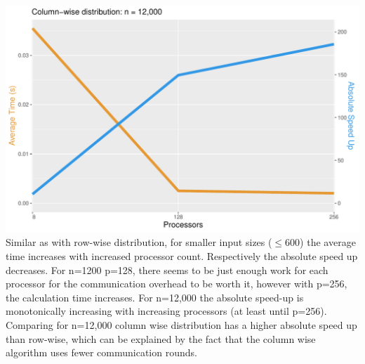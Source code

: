 \documentclass[a4paper,%
11pt,%
DIV=12,
headsepline,%
headings=normal,
]{scrartcl}
\begin{document}
\includegraphics[scale=0.4,page=1]{../plots/matrix_vector_plot_Column-wise-distribution_12000} \\

\noindent Similar as with row-wise distribution, for smaller input sizes ($\leq$600) the average time increases with increased processor count. Respectively the absolute speed up decreases. For n=1200 p=128, there seems to be just enough work for each processor for the communication overhead to be worth it, however with p=256, the calculation time increases. For n=12,000 the absolute speed-up is monotonically increasing with increasing processors (at least until p=256). Comparing for n=12,000 column wise distribution has a higher absolute speed up than row-wise, which can be explained by the fact that the column wise algorithm uses fewer communication rounds.
\end{document}
